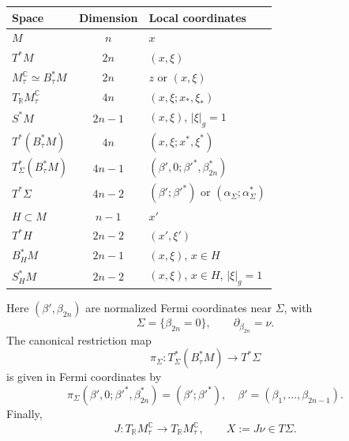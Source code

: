 \documentclass[11pt,reqno]{amsart}
\theoremstyle{definition}
\begin{document}
\begin{center}
\renewcommand{\arraystretch}{1.2}
\begin{tabular}{@{} l c l @{}}
\toprule
Space & Dimension & Local coordinates \\
\midrule
$M$                         & $n$    & $x$ \\

$T^*M$                      & $2n$   & $(x,\xi)$ \\

$M_\tau^{\mathbb C}
 \simeq B_\tau^*M$          & $2n$   & $z$ or $(x,\xi)$ \\

$T_{\mathbb R}M_\tau^{\mathbb C}$
                             & $4n$   & $(x,\xi; x_\ast,\xi_\ast)$ \\

$S^*M$                      & $2n-1$ & $(x,\xi)$, $|\xi|_g=1$ \\


$T^*(B_\tau^*M)$            & $4n$   & $(x,\xi;x^*,\xi^*)$ \\

$T^*_\Sigma(B_\tau^*M)$     & $4n-1$ & $(\beta',0;\beta'^*,\beta_{2n}^*)$ \\

$T^*\Sigma$                 & $4n-2$ & $(\beta';\beta'^*)$ or
                                        $(\alpha_\Sigma;\alpha_\Sigma^*)$ \\

$H\subset M$                & $n-1$  & $x'$ \\

$T^*H$                      & $2n-2$ & $(x',\xi')$ \\

$B_H^*M$                    & $2n-1$ & $(x,\xi)$, $x\in H$ \\

$S_H^*M$                    & $2n-2$ & $(x,\xi)$, $x\in H$, $|\xi|_g=1$ \\
\bottomrule
\end{tabular}
\end{center}

Here $(\beta',\beta_{2n})$ are normalized Fermi coordinates near $\Sigma$,
with
\[
    \Sigma=\{\beta_{2n}=0\},\qquad \partial_{\beta_{2n}}=\nu.
\]
The canonical restriction map
\[
    \pi_\Sigma:T^*_\Sigma(B_\tau^*M)\longrightarrow T^*\Sigma
\]
is given in Fermi coordinates by
\[
    \pi_\Sigma(\beta',0;\beta'^*,\beta^*_{2n})=(\beta';\beta'^*), \quad \beta' = (\beta_1,...,\beta_{2n-1}).
\]
Finally,
\[
    J:T_{\mathbb R}M_\tau^{\mathbb C}
      \longrightarrow T_{\mathbb R}M_\tau^{\mathbb C},
    \qquad
    X:=J\nu\in T\Sigma .
\]
\end{document}
